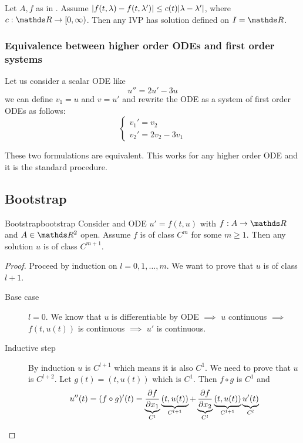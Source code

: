 \documentclass[12pt]{extarticle}
\begin{document}
\begin{theorem}{}{}
    Let $A, f$ as in .
    Assume $\abs{f(t, \lambda) - f(t, \lambda')} \leq c(t)\abs{\lambda - \lambda'}$, where $c: \R \to [0, \infty)$.
    Then any IVP has solution defined on $I = \R$.
\end{theorem}

\subsubsection{Equivalence between higher order ODEs and first order systems}

Let us consider a scalar ODE like
\begin{equation}
    u'' = 2 u' - 3u
\end{equation}
we can define $v_1 = u$ and $v = u'$ and rewrite the ODE as a system of first order ODEs as follows:
\begin{equation}
    \begin{cases}
        v_1' = v_2 \\
        v_2' = 2 v_2 - 3v_1
    \end{cases}
\end{equation}

These two formulations are equivalent.
This works for any higher order ODE and it is the standard procedure.

\subsection{Bootstrap}

\begin{proposition}{Bootstrap}{bootstrap}
    Consider and ODE $u' = f(t, u)$ with $f : A \to \R$ and $A \in \R^2$ open.
    Assume $f$ is of class $C^m$ for some $m \geq 1$.
    Then any solution $u$ is of class $C^{m+1}$.
\end{proposition}

\begin{proof}
    Proceed by induction on $l = 0, 1, \dots, m$.
    We want to prove that $u$ is of class $l +1$.
    \begin{description}
        \item[Base case] $l = 0$. We know that $u$ is differentiable by ODE $\implies$ $u$ continuous $\implies$ $f(t, u(t))$ is continuous $\implies$ $u'$ is continuous.
        \item[Inductive step] By induction $u$ is $C^{l+1}$ which means it is also $C^1$.
              We need to prove that $u$ is $C^{l+2}$.
              Let $g(t) = (t, u(t))$ which is $C^1$.
              Then $f \circ g$ is $C^1$ and
              \begin{equation}
                  u''(t) = (f \circ g)'(t) = \underbrace{\pdv{f}{x_1}()}_{C^l} \underbrace{(t, u(t))}_{C^{l+1}} + \underbrace{\pdv{f}{x_2}()}_{C^l}\underbrace{(t, u(t))}_{C^{l+1}} \underbrace{u'(t)}_{C^l}
              \end{equation}
    \end{description}
\end{proof}
\end{document}
